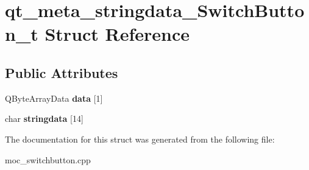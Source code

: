 \hypertarget{structqt__meta__stringdata__SwitchButton__t}{\section{qt\-\_\-meta\-\_\-stringdata\-\_\-\-Switch\-Button\-\_\-t Struct Reference}
\label{structqt__meta__stringdata__SwitchButton__t}
}
\subsection*{Public Attributes}
\begin{DoxyCompactItemize}
\item 
\hypertarget{structqt__meta__stringdata__SwitchButton__t_a5bc1dba7c24cc43215b6ee7f0c2f8de3}{Q\-Byte\-Array\-Data {\bfseries data} \mbox{[}1\mbox{]}}\label{structqt__meta__stringdata__SwitchButton__t_a5bc1dba7c24cc43215b6ee7f0c2f8de3}

\item 
\hypertarget{structqt__meta__stringdata__SwitchButton__t_a6caa4ce416e5c0f594802771ee17f051}{char {\bfseries stringdata} \mbox{[}14\mbox{]}}\label{structqt__meta__stringdata__SwitchButton__t_a6caa4ce416e5c0f594802771ee17f051}

\end{DoxyCompactItemize}


The documentation for this struct was generated from the following file\-:\begin{DoxyCompactItemize}
\item 
moc\-\_\-switchbutton.\-cpp\end{DoxyCompactItemize}
